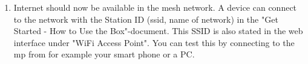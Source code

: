\begin{enumerate}
\item Internet should now be available in the mesh network. A device can connect to the network with the Station ID (\gls{ssid}, name of network) in the "Get Started - How to Use the Box"-document. This SSID is also stated in the web interface under "WiFi Access Point". You can test this by connecting to the \gls{mp} from for example your smart phone or a PC.
\end{enumerate}
